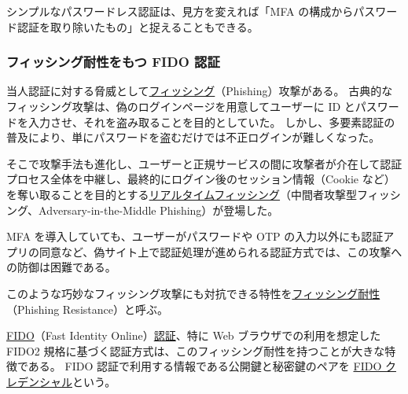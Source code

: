 \documentclass[uplatex]{jsarticle}
\def\label#1{}%
\begin{document}
\begin{rem}\label{rem:ch2-mfa-vs-passwordless}
シンプルなパスワードレス認証は、見方を変えれば「MFA の構成からパスワード認証を取り除いたもの」と捉えることもできる。
\end{rem}

\subsubsection{フィッシング耐性をもつ FIDO 認証}

当人認証に対する脅威として\underline{フィッシング}（Phishing）攻撃がある。
古典的なフィッシング攻撃は、偽のログインページを用意してユーザーに ID とパスワードを入力させ、それを盗み取ることを目的としていた。
しかし、多要素認証の普及により、単にパスワードを盗むだけでは不正ログインが難しくなった。

\begin{dfn}[リアルタイムフィッシング]\label{dfn:ch2-realtime-phishing}
そこで攻撃手法も進化し、ユーザーと正規サービスの間に攻撃者が介在して認証プロセス全体を中継し、最終的にログイン後のセッション情報（Cookie など）を奪い取ることを目的とする\underline{リアルタイムフィッシング}（中間者攻撃型フィッシング、Adversary-in-the-Middle Phishing）が登場した。
\end{dfn}

\begin{rem}\label{rem:ch2-realtime-phishing-mfa}
MFA を導入していても、ユーザーがパスワードや OTP の入力以外にも認証アプリの同意など、偽サイト上で認証処理が進められる認証方式では、この攻撃への防御は困難である。
\end{rem}

\begin{dfn}[フィッシング耐性]\label{dfn:ch2-phishing-resistance}
このような巧妙なフィッシング攻撃にも対抗できる特性を\underline{フィッシング耐性}（Phishing Resistance）と呼ぶ。
\end{dfn}

\begin{dfn}[FIDO 認証]\label{dfn:fido-auth}
\underline{FIDO}（Fast Identity Online）\underline{認証}、特に Web ブラウザでの利用を想定した FIDO2 規格に基づく認証方式は、このフィッシング耐性を持つことが大きな特徴である。
FIDO 認証で利用する情報である公開鍵と秘密鍵のペアを \underline{FIDO クレデンシャル}という。
\end{dfn}
\end{document}
